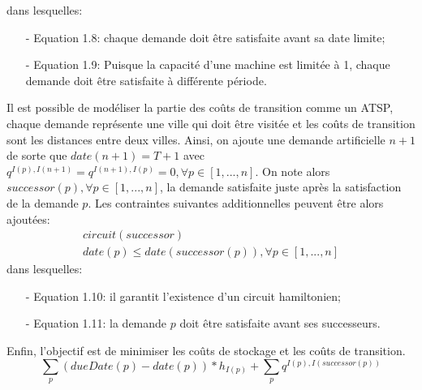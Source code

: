 		dans lesquelles:
		\begin{itemize}
			\item[-] Equation 1.8: chaque demande doit être satisfaite avant sa date limite;
			\item[-] Equation 1.9: Puisque la capacité d'une machine est limitée à 1, chaque demande doit être satisfaite à différente période.
		\end{itemize}
		Il est possible de modéliser la partie des coûts de transition comme un ATSP, chaque demande représente une ville qui doit être visitée et les coûts de transition sont les distances entre deux villes. Ainsi, on ajoute une demande artificielle $n+1$ de sorte que $date(n+1) = T+1$ avec $q^{I(p), I(n+1)} = q^{I(n+1), I(p)} = 0, \forall p \in [1,...,n]$. On note alors $successor(p), \forall p \in [1,...,n]$, la demande satisfaite juste après la satisfaction de la demande $p$. Les contraintes suivantes additionnelles peuvent être alors ajoutées:
		\begin{eqnarray}
			circuit(successor) \\
			date(p) \leq date(successor(p)), \forall p \in [1,...,n]
		\end{eqnarray}
		dans lesquelles:
		\begin{itemize}
			\item[-] Equation 1.10: il garantit l'existence d'un circuit hamiltonien;
			\item[-] Equation 1.11: la demande $p$ doit être satisfaite avant ses successeurs.
		\end{itemize}
		
		Enfin, l'objectif est de minimiser les coûts de stockage et les coûts de transition.
		\[
			\sum_{p}{(dueDate(p)-date(p))} * h_{I(p)} + \sum_{p}{q^{I(p),I(successor(p))}}
		\]
		
	
